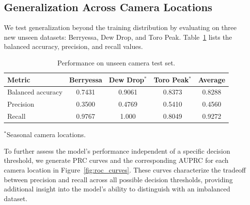 \documentclass[remotesensing,article,submit,moreauthors]{Definitions/mdpi}
\begin{document}
\subsection{Generalization Across Camera Locations}


We test generalization beyond the training distribution by evaluating on three new unseen datasets: Berryessa, Dew Drop, and Toro Peak. Table~\ref{tab:camera_accuracies} lists the balanced accuracy, precision, and recall values. 

\begin{table}[H]
\centering

\caption{Performance on unseen camera test set.}
\label{tab:camera_accuracies}

\begin{tabular}{lcccc}
\toprule
\textbf{Metric} & Berryessa & Dew Drop$^{*}$ & Toro Peak$^{*}$ & Average \\
\midrule

Balanced accuracy & 0.7431 & 0.9061 & 0.8373 & 0.8288 \\
Precision & 0.3500 & 0.4769 & 0.5410 & 0.4560 \\
Recall & 0.9767 & 1.000 & 0.8049 & 0.9272 \\

\bottomrule
\end{tabular}

\vspace{4pt}
\footnotesize
$^{*}$Seasonal camera locations.

\end{table}

To further assess the model's performance independent of a specific decision threshold, we generate \ac{PRC} curves and the corresponding \ac{AUPRC} for each camera location in Figure~\ref{fig:roc_curves}. These curves characterize the tradeoff between precision and recall across all possible decision thresholds, providing additional insight into the model's ability to distinguish with an imbalanced dataset. 
\end{document}
